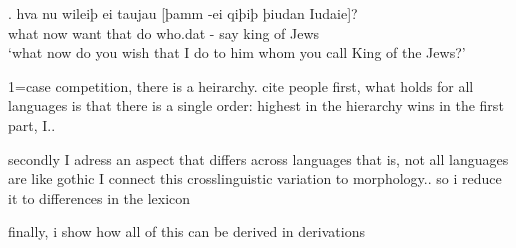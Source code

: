 \exg. hva nu wileiþ ei taujau [þamm -ei qiþiþ þiudan Iudaie]?\\
 what now want that do\scsub{[dat]} who.\ac{dat} - say\scsub{[acc]} king {of Jews}\\
 `what now do you wish that I do to him whom you call King of the Jews?' 


1=case competition, there is a heirarchy. cite people
first, what holds for all languages is that there is a single order: highest in the hierarchy wins
in the first part, I..

secondly I adress an aspect that differs across languages
that is, not all languages are like gothic
I connect this crosslinguistic variation to morphology.. so i reduce it to differences in the lexicon

finally, i show how all of this can be derived in derivations
